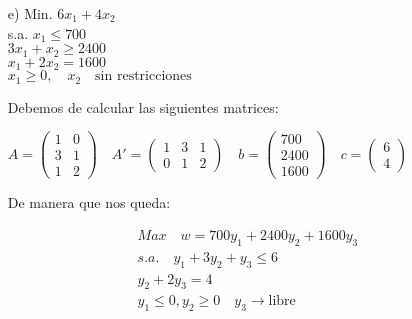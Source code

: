 \begin{itemize}
    \item[e)] Min. \quad $6x_1 + 4x_2$ \\
    s.a. \quad $x_1 \leq 700$ \\
    \quad \quad $3x_1 + x_2 \geq 2400$ \\
    \quad \quad $x_1 + 2x_2 = 1600$ \\
    \quad \quad $x_1 \geq 0, \quad x_2 \quad \text{sin restricciones}$

    Debemos de calcular las siguientes matrices:

    $ A =
    \begin{pmatrix}
        1 & 0 \\
        3 & 1 \\
        1 & 2
    \end{pmatrix} \quad
    A' = \begin{pmatrix}
        1 & 3 & 1 \\
        0 & 1 & 2
    \end{pmatrix}
    \quad b = \begin{pmatrix}
        700 \\
        2400 \\
        1600
    \end{pmatrix} \quad c = \begin{pmatrix}
        6 \\
        4
    \end{pmatrix}
    $       

    De manera que nos queda:

    \begin{align*}
        Max \quad w = 700y_1 + 2400y_2 + 1600y_3 \\
        s.a. \quad y_1 + 3y_2 + y_3 \leq 6 \\
        y_2 + 2y_3 = 4 \\
        y_1\leq0 , y_2 \geq 0 \quad y_3 \rightarrow \text{libre}
    \end{align*}
\end{itemize}

